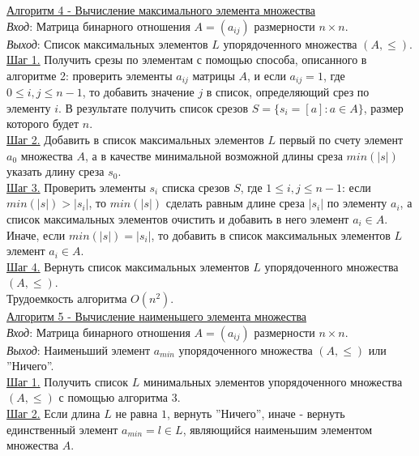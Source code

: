 \documentclass[bachelor, och, labwork]{shiza}
\begin{document}
        \underline{Алгоритм 4 - Вычисление максимального элемента множества}\\
            \textit{Вход}: Матрица бинарного отношения $A = (a_{ij})$ размерности $n \times n$.\\
            \textit{Выход}: Список максимальных элементов $L$ упорядоченного множества $(A, \leq)$.\\
            \underline{Шаг 1.} Получить срезы по элементам с помощью способа, описанного в алгоритме 2: проверить
            элементы $a_{ij}$ матрицы $A$, и если $a_{ij} = 1$, где $0 \leq i, j \leq n - 1$, то добавить значение $j$ в
            список, определяющий срез по элементу $i$. В результате получить список срезов $S = \{s_i = [a]: a \in A\}$,
            размер которого будет $n$. \\
            \underline{Шаг 2.} Добавить в список максимальных элементов $L$ первый по счету элемент $a_0$ множества $A$,
            а в качестве минимальной возможной длины среза $min(|s|)$ указать длину среза $s_0$.\\
            \underline{Шаг 3.} Проверить элементы $s_i$ списка срезов $S$, где $1 \leq i, j \leq n - 1$: если $min(|s|)
            > |s_i|$, то $min(|s|)$ сделать равным длине среза $|s_i|$ по элементу $a_i$, а список максимальных
            элементов очистить и добавить в него элемент $a_i \in A$. Иначе, если $min(|s|) = |s_i|$, то добавить в
            список максимальных элементов $L$ элемент $a_i \in A$. \\
            \underline{Шаг 4.} Вернуть список максимальных элементов $L$ упорядоченного множества $(A, \leq)$.\\

            Трудоемкость алгоритма $O(n^2)$.\\

        \underline{Алгоритм 5 - Вычисление наименьшего элемента множества}\\
            \textit{Вход}: Матрица бинарного отношения $A = (a_{ij})$ размерности $n \times n$.\\
            \textit{Выход}: Наименьший элемент $a_{min}$ упорядоченного множества $(A, \leq)$ или ''Ничего''.\\
            \underline{Шаг 1.} Получить список $L$ минимальных элементов упорядоченного множества $(A, \leq)$ с помощью алгоритма 3. \\
            \underline{Шаг 2.} Если длина $L$ не равна $1$, вернуть ''Ничего'', иначе - вернуть единственный элемент $a_{min} = l \in L$, являющийся наименьшим элементом множества $A$.\\
                
\end{document}
